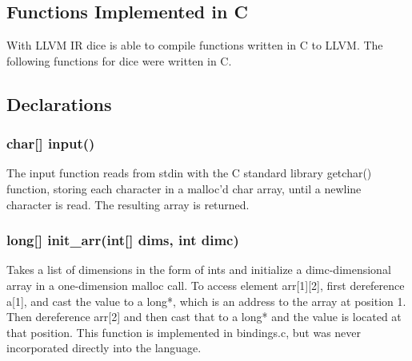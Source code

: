 \begin{homeworkProblem}
	\subsection{Functions Implemented in C}
	With LLVM IR dice is able to compile functions written in C to LLVM. The following functions for dice were written in C.
	
	\subsection{Declarations}
	\subsubsection{char[] input()}
	The input function reads from stdin with the C standard library getchar() function, storing each character in a malloc'd char array, until a newline character is read. The resulting array is returned.
	\subsubsection{long[] init\_arr(int[] dims, int dimc)}
	Takes a list of dimensions in the form of ints and initialize a dimc-dimensional array in a one-dimension malloc call. To access element arr[1][2], first dereference a[1], and cast the value to a long*, which is an address to the array at position 1. Then dereference arr[2] and then cast that to a long* and the value is located at that position. This function is implemented in bindings.c, but was never incorporated directly into the language. 
\end{homeworkProblem}